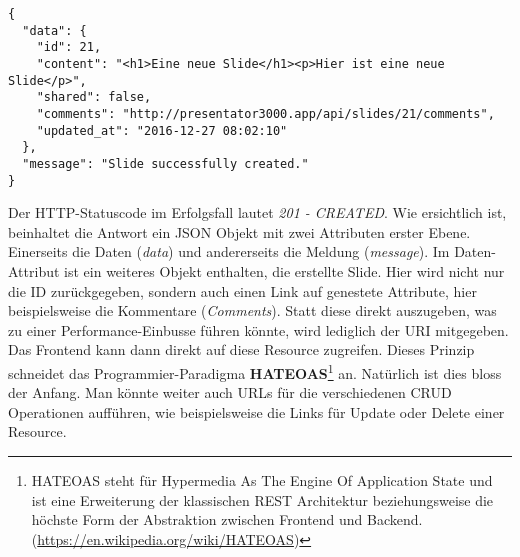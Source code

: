 \begin{lstlisting}[caption=HTTP Response für eine neu anglegte Slide]
{
  "data": {
    "id": 21,
    "content": "<h1>Eine neue Slide</h1><p>Hier ist eine neue Slide</p>",
    "shared": false,
    "comments": "http://presentator3000.app/api/slides/21/comments",
    "updated_at": "2016-12-27 08:02:10"
  },
  "message": "Slide successfully created."
}
\end{lstlisting}
Der HTTP-Statuscode im Erfolgsfall lautet \emph{201 - CREATED}. Wie ersichtlich ist, beinhaltet die Antwort ein JSON Objekt mit zwei Attributen erster Ebene. Einerseits die Daten (\emph{data}) und andererseits die Meldung (\emph{message}). Im Daten-Attribut ist ein weiteres Objekt enthalten, die erstellte Slide. Hier wird nicht nur die ID zurückgegeben, sondern auch einen Link auf genestete Attribute, hier beispielsweise die Kommentare (\emph{Comments}). Statt diese direkt auszugeben, was zu einer Performance-Einbusse führen könnte, wird lediglich der URI mitgegeben. Das Frontend kann dann direkt auf diese Resource zugreifen. Dieses Prinzip schneidet das Programmier-Paradigma \textbf{HATEOAS}\footnote{HATEOAS steht für Hypermedia As The Engine Of Application State und ist eine Erweiterung der klassischen REST Architektur beziehungsweise die höchste Form der Abstraktion zwischen Frontend und Backend. (\url{https://en.wikipedia.org/wiki/HATEOAS})} an. Natürlich ist dies bloss der Anfang. Man könnte weiter auch URLs für die verschiedenen CRUD Operationen aufführen, wie beispielsweise die Links für Update oder Delete einer Resource. 
